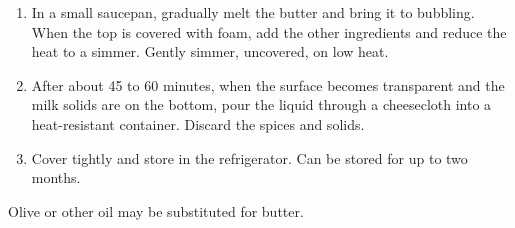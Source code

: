
\label{niter-kebbeh}

\begin{ingredients}
\end{ingredients}


\begin{recipe}
  \begin{enumerate}

  \item In a small saucepan, gradually melt the butter and bring it to
    bubbling.  When the top is covered with foam, add the other
    ingredients and reduce the heat to a simmer.  Gently simmer,
    uncovered, on low heat.

  \item After about 45 to 60 minutes, when the surface becomes
    transparent and the milk solids are on the bottom, pour the liquid
    through a cheesecloth into a heat-resistant container.  Discard
    the spices and solids.

  \item Cover tightly and store in the refrigerator.  Can be stored
    for up to two months.

  \end{enumerate}

Olive or other oil may be substituted for butter.

\end{recipe}
